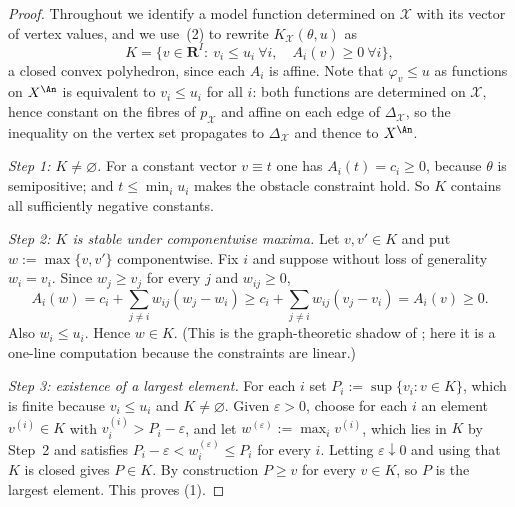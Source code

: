 \begin{proof}
Throughout we identify a model function determined on \(\mathcal X\) with its
vector of vertex values, and we use \,(2)
to rewrite \(K_{\mathcal X}(\theta,u)\) as
\begin{equation}\label{eq:ch23-curve-polyhedron}
 K=\{v\in\mathbf R^I:\ v_i\leq u_i\ \forall i,\quad
     A_i(v)\geq0\ \forall i\},
\end{equation}
a closed convex polyhedron, since each \(A_i\) is affine.  Note that
\(\varphi_v\leq u\) as functions on \(X^{\An}\) is equivalent to
\(v_i\leq u_i\) for all \(i\): both functions are determined on
\(\mathcal X\), hence constant on the fibres of \(p_{\mathcal X}\) and
affine on each edge of \(\Delta_{\mathcal X}\), so the inequality on the
vertex set propagates to \(\Delta_{\mathcal X}\) and thence to \(X^{\An}\).

\emph{Step 1: \(K\ne\varnothing\).}  For a constant vector \(v\equiv t\) one
has \(A_i(t)=c_i\geq0\), because \(\theta\) is semipositive; and
\(t\leq\min_iu_i\) makes the obstacle constraint hold.  So
\(K\) contains all sufficiently negative constants.

\emph{Step 2: \(K\) is stable under componentwise maxima.}  Let
\(v,v'\in K\) and put \(w:=\max\{v,v'\}\) componentwise.  Fix \(i\) and
suppose without loss of generality \(w_i=v_i\).  Since \(w_j\geq v_j\) for
every \(j\) and \(w_{ij}\geq0\),
\[
 A_i(w)=c_i+\sum_{j\ne i}w_{ij}(w_j-w_i)
       \geq c_i+\sum_{j\ne i}w_{ij}(v_j-v_i)
       =A_i(v)\geq0 .
\]
Also \(w_i\leq u_i\).  Hence \(w\in K\).  (This is the graph-theoretic
shadow of ; here it is a one-line computation
because the constraints are linear.)

\emph{Step 3: existence of a largest element.}  For each \(i\) set
\(P_i:=\sup\{v_i:v\in K\}\), which is finite because \(v_i\leq u_i\) and
\(K\ne\varnothing\).  Given \(\varepsilon>0\), choose for each \(i\) an
element \(v^{(i)}\in K\) with \(v^{(i)}_i>P_i-\varepsilon\), and let
\(w^{(\varepsilon)}:=\max_iv^{(i)}\), which lies in \(K\) by Step~2 and
satisfies \(P_i-\varepsilon<w^{(\varepsilon)}_i\leq P_i\) for every \(i\).
Letting \(\varepsilon\downarrow0\) and using that \(K\) is closed gives
\(P\in K\).  By construction \(P\geq v\) for every \(v\in K\), so \(P\) is
the largest element.  This proves (1).


\end{proof}
